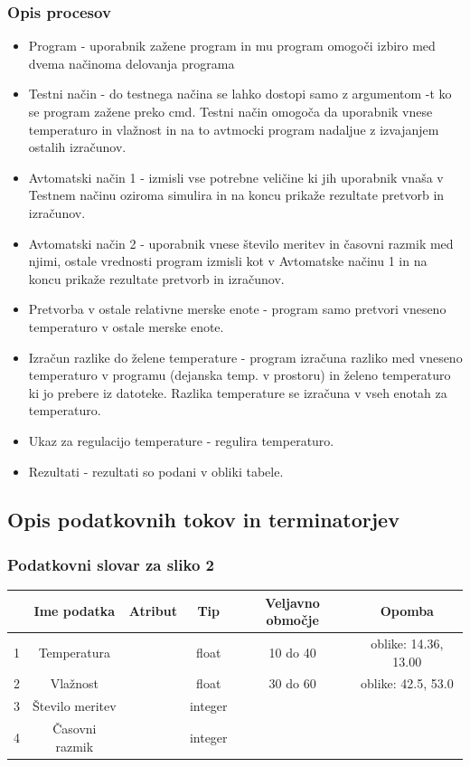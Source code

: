 \documentclass[a4paper,12pt]{article}
\begin{document}
			\subsubsection{Opis procesov}
		
				\begin{itemize}
					\item Program - uporabnik zažene program in mu program omogoči izbiro med dvema načinoma delovanja programa
					\item Testni način - do testnega načina se lahko dostopi samo z argumentom -t ko se program zažene preko cmd.
						Testni način omogoča da uporabnik vnese temperaturo in vlažnost in na to avtmocki program nadaljue z izvajanjem
						ostalih izračunov.
					\item Avtomatski način 1 - izmisli vse potrebne veličine ki jih uporabnik vnaša v Testnem načinu oziroma simulira in
						na koncu prikaže rezultate pretvorb in izračunov.
					\item Avtomatski način 2 - uporabnik vnese število meritev in časovni razmik med njimi, ostale vrednosti program
						izmisli kot v Avtomatske načinu 1 in na koncu prikaže rezultate pretvorb in izračunov.
					\item Pretvorba v ostale relativne merske enote - program samo pretvori vneseno temperaturo v ostale merske enote.
					\item Izračun razlike do želene temperature - program izračuna razliko med vneseno temperaturo v programu 
						(dejanska temp. v prostoru) in želeno temperaturo ki jo prebere iz datoteke. Razlika temperature se izračuna
						v vseh enotah za temperaturo.
					\item Ukaz za regulacijo temperature - regulira temperaturo.
					\item Rezultati - rezultati so podani v obliki tabele.
				\end{itemize}


		\subsection{Opis podatkovnih tokov in terminatorjev}

			\subsubsection{Podatkovni slovar za sliko 2}

			\begin{center}
			\begin{tabular}{|c|c|c|c|c|c|}
					\hline 
					\rowcolor{purple!30!} &Ime podatka&Atribut&Tip&Veljavno območje&Opomba\\
					\hline
					1&Temperatura&&float&10 do 40&oblike: 14.36, 13.00\\
					\hline
					2&Vlažnost&&float&30 do 60&oblike: 42.5, 53.0\\
					\hline
					3&Število meritev&&integer&&\\
					\hline
					4&Časovni razmik&&integer&&\\
					\hline
			\end{tabular}
			\end{center}
\end{document}
